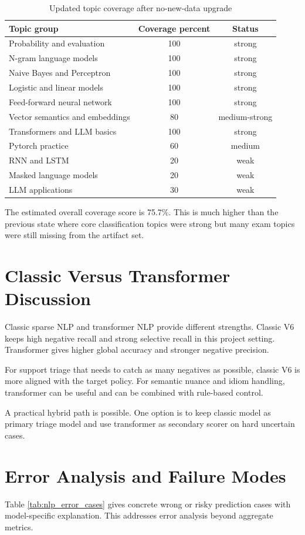 \documentclass[12pt,a4paper]{article}
\begin{document}
\begin{table}[H]
\centering
\caption{Updated topic coverage after no-new-data upgrade}
\label{tab:nlp_course_fit}
\begin{tabular}{lcc}
\toprule
Topic group & Coverage percent & Status \\
\midrule
Probability and evaluation & 100 & strong \\
N-gram language models & 100 & strong \\
Naive Bayes and Perceptron & 100 & strong \\
Logistic and linear models & 100 & strong \\
Feed-forward neural network & 100 & strong \\
Vector semantics and embeddings & 80 & medium-strong \\
Transformers and LLM basics & 100 & strong \\
Pytorch practice & 60 & medium \\
RNN and LSTM & 20 & weak \\
Masked language models & 20 & weak \\
LLM applications & 30 & weak \\
\bottomrule
\end{tabular}
\end{table}

The estimated overall coverage score is 75.7\%. This is much higher than the previous state where core classification topics were strong but many exam topics were still missing from the artifact set.

\section{Classic Versus Transformer Discussion}
Classic sparse NLP and transformer NLP provide different strengths. Classic V6 keeps high negative recall and strong selective recall in this project setting. Transformer gives higher global accuracy and stronger negative precision.

For support triage that needs to catch as many negatives as possible, classic V6 is more aligned with the target policy. For semantic nuance and idiom handling, transformer can be useful and can be combined with rule-based control.

A practical hybrid path is possible. One option is to keep classic model as primary triage model and use transformer as secondary scorer on hard uncertain cases.

\section{Error Analysis and Failure Modes}
Table \ref{tab:nlp_error_cases} gives concrete wrong or risky prediction cases with model-specific explanation. This addresses error analysis beyond aggregate metrics.
\end{document}
